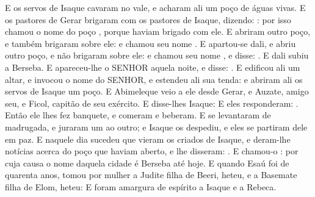 {{  E os servos de Isaque cavaram no vale, e acharam ali um poço de águas vivas.
  E os pastores de Gerar brigaram com os pastores de Isaque, dizendo: : por isso chamou o nome do poço , porque haviam brigado com ele.
  E abriram outro poço, e também brigaram sobre ele: e chamou seu nome .
  E apartou-se dali, e abriu outro poço, e não brigaram sobre ele: e chamou seu nome , e disse: .
  E dali subiu a Berseba.
  E apareceu-lhe o SENHOR aquela noite, e disse: .
  E edificou ali um altar, e invocou o nome do SENHOR, e estendeu ali sua tenda: e abriram ali os servos de Isaque um poço.
  E Abimeleque veio a ele desde Gerar, e Auzate, amigo seu, e Ficol, capitão de seu exército.
  E disse-lhes Isaque: 
  E eles responderam: . %
  Então ele lhes fez banquete, e comeram e beberam.
  E se levantaram de madrugada, e juraram um ao outro; e Isaque os despediu, e eles se partiram dele em paz.
  E naquele dia sucedeu que vieram os criados de Isaque, e deram-lhe notícias acerca do poço que haviam aberto, e lhe disseram: .
  E chamou-o : por cuja causa o nome daquela cidade é Berseba até hoje.
  E quando Esaú foi de quarenta anos, tomou por mulher a Judite filha de Beeri, heteu, e a Basemate filha de Elom, heteu: %
  E foram amargura de espírito a Isaque e a Rebeca.
\par }

}

